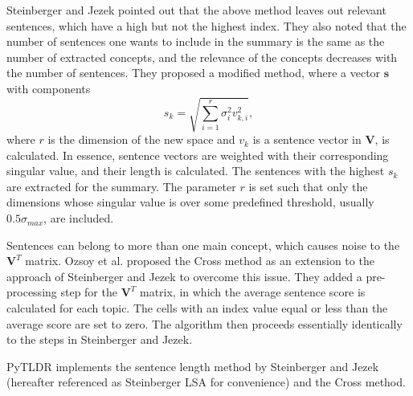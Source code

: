 \documentclass[conference]{IEEEtran}
\begin{document}
Steinberger and Jezek \cite{steinberger2004} pointed out that the above method leaves out relevant sentences, which have a high but not the highest index. They also noted that the number of sentences one wants to include in the summary is the same as the number of extracted concepts, and the relevance of the concepts decreases with the number of sentences. They proposed a modified method, where a vector $\mathbf{s}$ with components
\begin{equation}
s_k = \sqrt{\sum \limits_{i=1}^{r} \sigma_i^2 v_{k,i}^2},
\end{equation}
where $r$ is the dimension of the new space and $v_k$ is a sentence vector in $\mathbf{V}$, is calculated. In essence, sentence vectors are weighted with their corresponding singular value, and their length is calculated. The sentences with the highest $s_k$ are extracted for the summary. The parameter $r$ is set such that only the dimensions whose singular value is over some predefined threshold, usually $0.5 \sigma_{max}$, are included.

Sentences can belong to more than one main concept, which causes noise to the $\mathbf{V}^T$ matrix. Ozsoy et al. \cite{ozsoy2010} proposed the Cross method as an extension to the approach of Steinberger and Jezek to overcome this issue. They added a pre-processing step for the $\mathbf{V}^T$ matrix, in which the average sentence score is calculated for each topic. The cells with an index value equal or less than the average score are set to zero. The algorithm then proceeds essentially identically to the steps in Steinberger and Jezek.

PyTLDR implements the sentence length method by Steinberger and Jezek (hereafter referenced as Steinberger LSA for convenience) and the Cross method.%
\end{document}
